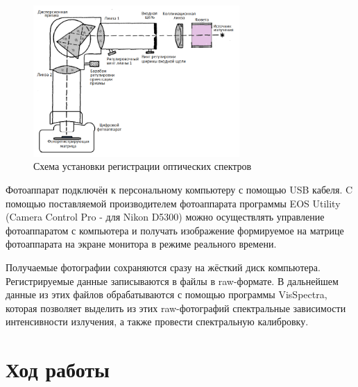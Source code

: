 \documentclass[11.5pt,a4paper,russian]{article}
\begin{document}
\begin{figure}[h!]
  \centering
  \includegraphics[width=0.7\textwidth]{147ff95c-a921-4ffa-b390-beb2908f24cf}  \caption{Схема установки регистрации оптических спектров}
  \label{fig:ustanovka}
\end{figure}

Фотоаппарат подключён к персональному компьютеру с помощью USB кабеля. C помощью поставляемой производителем фотоаппарата программы EOS Utility (Camera Control Pro - для Nikon D5300) можно осуществлять управление фотоаппаратом с компьютера и получать изображение формируемое на матрице фотоаппарата на экране монитора в режиме реального времени.

Получаемые фотографии сохраняются сразу на жёсткий диск компьютера. Регистрируемые данные записываются в файлы в raw-формате. В дальнейшем данные из этих файлов обрабатываются с помощью программы VisSpectra, которая позволяет выделить из этих raw-фотографий спектральные зависимости интенсивности излучения, а также провести спектральную калибровку.

\section{Ход работы}
\end{document}
